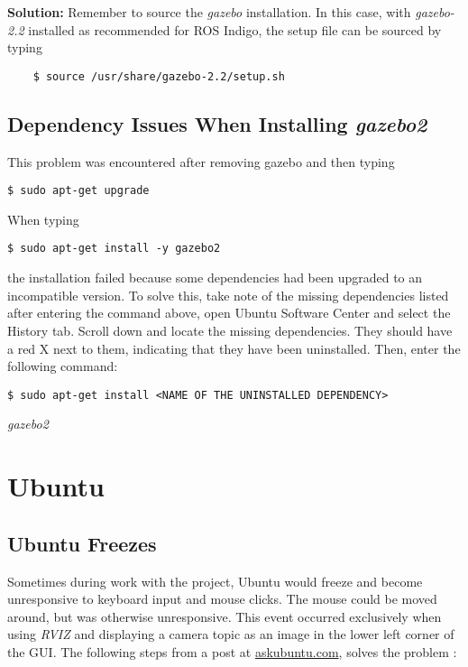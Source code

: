 \textbf{Solution: } Remember to source the \textit{gazebo} installation. In this case, with \textit{gazebo-2.2} installed as recommended for \ac{ROS} Indigo, the setup file can be sourced by typing

\begin{verbatim}
	$ source /usr/share/gazebo-2.2/setup.sh
\end{verbatim}

\subsection{Dependency Issues When Installing \textit{gazebo2}}

This problem was encountered after removing gazebo and then typing

\begin{verbatim}
$ sudo apt-get upgrade
\end{verbatim}

When typing 

\begin{verbatim}
$ sudo apt-get install -y gazebo2
\end{verbatim}

the installation failed because some dependencies had been upgraded to an incompatible version. To solve this, take note of the missing dependencies listed after entering the command above, open Ubuntu Software Center and select the History tab. Scroll down and locate the missing dependencies. They should have a red X next to them, indicating that they have been uninstalled. Then, enter the following command:

\begin{verbatim}
$ sudo apt-get install <NAME OF THE UNINSTALLED DEPENDENCY>
\end{verbatim}

\textit{gazebo2} 

\section{Ubuntu}

\subsection{Ubuntu Freezes}

Sometimes during work with the project, Ubuntu would freeze and become unresponsive to keyboard input and mouse clicks. The mouse could be moved around, but was otherwise unresponsive. This event occurred exclusively when using \textit{RVIZ} and displaying a camera topic as an image in the lower left corner of the \ac{GUI}. The following steps from a post at \href{http://askubuntu.com/questions/4408/what-should-i-do-when-ubuntu-freezes/36717#36717}{askubuntu.com}, solves the problem \cite{Reboot_Ubuntu}:

